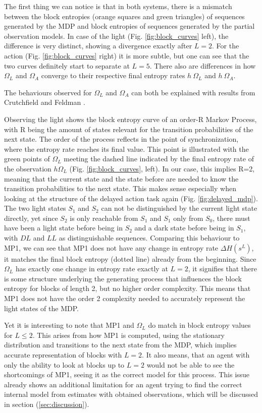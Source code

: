 \documentclass[12pt,a4paper]{article}
\begin{document}
The first thing we can notice is that in both systems, there is a mismatch between the
block entropies (orange squares and green triangles) of sequences generated by the MDP and block entropies of sequences generated by the partial observation models.
In case of the light (Fig. \ref{fig:block_curves} left), the difference is very distinct, showing a divergence exactly after $L=2$.
For the action (Fig. \ref{fig:block_curves} right) it is more subtle, but one can see that the two curves definitely start to separate at $L=5$.
There also are differences in how $\Omega_L$ and $\Omega_A$ converge to their respective final entropy rates $h\ \Omega_L$ and $h\ \Omega_A$.

The behaviours observed for $\Omega_L$ and $\Omega_A$ can both be explained with results from Crutchfield and Feldman \autocite{crutchfield2003regularities}.

Observing the light shows the block entropy curve of an order-R Markov Process, with R being the amount of states relevant for the transition probabilities of the next state.
The order of the process reflects in the point of synchronization, where the entropy rate reaches its final value.
This point is illustrated with the green points of $\Omega_L$ meeting the dashed line indicated by the final entropy rate of the observation $h \Omega_L$ (Fig. \ref{fig:block_curves}, left).
In our case, this implies R=2, meaning that the current state and the state before are needed to know the transition probabilities to the next state.
This makes sense especially when looking at the structure of the delayed action task again (Fig. \ref{fig:delayed_mdp}).
The two light states $S_1$ and $S_2$ can not be distinguished by the current light state directly, yet since $S_2$ is only reachable from $S_1$ and $S_1$ only from $S_0$, there must have been a light state before being in $S_2$ and a dark state before being in $S_1$, with $DL$ and $LL$ as distinguishable sequences.
Comparing this behaviour to MP1, we can see that MP1 does not have any change in entropy rate $\Delta H(s^L)$, it matches the final block entropy (dotted line) already from the beginning.
Since $\Omega_L$ has exactly one change in entropy rate exactly at $L=2$, it signifies that there is some structure underlying the generating process that influences the block entropy for blocks of length 2, but no higher order complexity.
This means that MP1 does not have the order 2 complexity needed to accurately represent the light states of the MDP.

Yet it is interesting to note that MP1 and $\Omega_L$ do match in block entropy values for $L \leq 2$.
This arises from how MP1 is computed, using the stationary distribution and transitions to the next state from the MDP, which implies accurate representation of blocks with $L=2$.
It also means, that an agent with only the ability to look at blocks up to $L=2$ would not be able to see the shortcomings of MP1, seeing it as the correct model for this process.
This issue already shows an additional limitation for an agent trying to find the correct internal model from estimates with obtained observations, which will be discussed in section (\ref{sec:discussion}).
\end{document}
